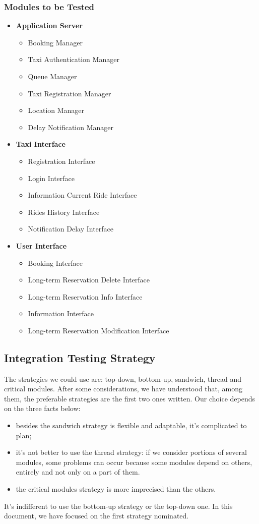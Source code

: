 		\subsubsection{Modules to be Tested}
		
		\begin{itemize}
			\item \textbf{Application Server}
			\begin{itemize}
				\item Booking Manager
				\item Taxi Authentication Manager
				\item Queue Manager
				\item Taxi Registration Manager
				\item Location Manager
				\item Delay Notification Manager
			\end{itemize}
			\item \textbf{Taxi Interface}
			\begin{itemize}
				\item Registration Interface
				\item Login Interface
				\item Information Current Ride Interface
				\item Rides History Interface
				\item Notification Delay Interface
			\end{itemize}
			\item \textbf{User Interface}
			\begin{itemize}
				\item Booking Interface
				\item Long-term Reservation Delete Interface
				\item Long-term Reservation Info Interface
				\item Information Interface
				\item Long-term Reservation Modification Interface
			\end{itemize}
		\end{itemize}
\subsection{Integration Testing Strategy}
The strategies we could use are: top-down, bottom-up, sandwich, thread and critical modules. After some considerations, we have understood that, among them, the preferable strategies are the first two ones written. Our choice depends on the three facts below:
	\begin{itemize}
		\item besides the sandwich strategy is flexible and adaptable, it's complicated to plan;
		\item it's not better to use the thread strategy: if we consider portions of several modules, some problems can occur because some modules depend on others, entirely and not only on a part of them.
		\item the critical modules strategy is more imprecised than the others.      
	\end{itemize} 
It's indifferent to use the bottom-up strategy or the top-down one. In this document, we have focused on the first strategy nominated.
